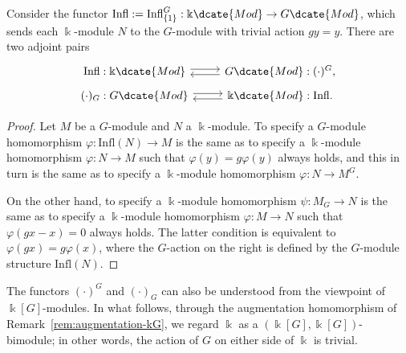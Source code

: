 \begin{proposition}\label{prop:inv-coinv-infl}
	Consider the functor
	$\mathrm{Infl}:=\mathrm{Infl}^G_{\{1\}}:\Bbbk\dcate{Mod}\to
	G\dcate{Mod}$, which sends each $\Bbbk$-module $N$ to the $G$-module with
	trivial action $gy=y$. There are two adjoint pairs
	\[\begin{tikzcd}[row sep=tiny]
		\mathrm{Infl}: \Bbbk\dcate{Mod} \arrow[shift left, r] & G\dcate{Mod} : (\cdot)^G , \arrow[shift left, l] \\
		(\cdot)_G: G\dcate{Mod} \arrow[shift left, r] & \Bbbk\dcate{Mod}: \mathrm{Infl}. \arrow[shift left, l]
	\end{tikzcd}\]
\end{proposition}
\begin{proof}
	Let $M$ be a $G$-module and $N$ a $\Bbbk$-module. To specify a
	$G$-module homomorphism $\varphi:\mathrm{Infl}(N)\to M$ is the same as to
	specify a $\Bbbk$-module homomorphism $\varphi:N\to M$ such that
	$\varphi(y)=g\varphi(y)$ always holds, and this in turn is the same as to
	specify a $\Bbbk$-module homomorphism $\varphi:N\to M^G$.

	On the other hand, to specify a $\Bbbk$-module homomorphism
	$\psi:M_G\to N$ is the same as to specify a $\Bbbk$-module homomorphism
	$\varphi:M\to N$ such that $\varphi(gx-x)=0$ always holds. The latter
	condition is equivalent to $\varphi(gx)=g\varphi(x)$, where the $G$-action
	on the right is defined by the $G$-module structure $\mathrm{Infl}(N)$.
\end{proof}

The functors $(\cdot)^G$ and $(\cdot)_G$ can also be understood from the
viewpoint of $\Bbbk[G]$-modules. In what follows, through the augmentation
homomorphism of Remark~\ref{rem:augmentation-kG}, we regard $\Bbbk$ as a
$(\Bbbk[G],\Bbbk[G])$-bimodule; in other words, the action of $G$ on either
side of $\Bbbk$ is trivial.

